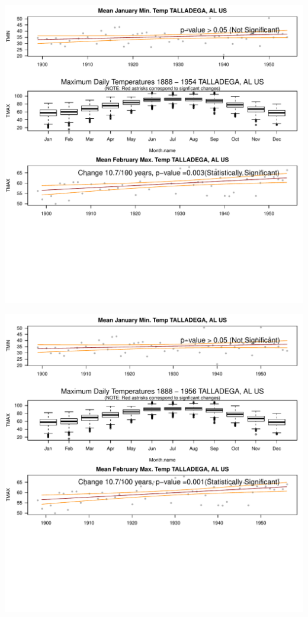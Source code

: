 \documentclass{article}\usepackage[]{graphicx}\usepackage[]{color}
\makeatletter
\def\maxwidth{ %
  \ifdim\Gin@nat@width>\linewidth
    \linewidth
  \else
    \Gin@nat@width
  \fi
}
\newenvironment{knitrout}{}{} %
\makeatother
\begin{document}
\begin{knitrout}
\includegraphics[width=\maxwidth]{figure/static_template-23} 

\includegraphics[width=\maxwidth]{figure/static_template-24} 


\end{knitrout}
\end{document}
